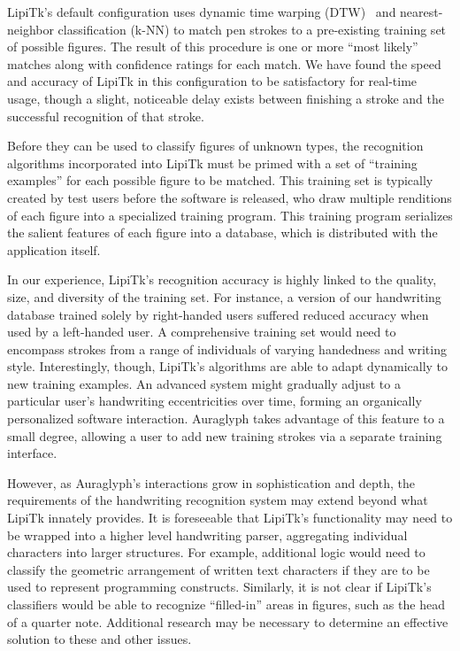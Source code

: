 \documentclass[10pt,letterpaper]{article}
\begin{document}
LipiTk's default configuration uses dynamic time warping (DTW)~\cite{niels2005using} and nearest-neighbor classification (k-NN) to match pen strokes to a pre-existing training set of possible figures. 
The result of this procedure is one or more ``most likely'' matches along with confidence ratings for each match. 
We have found the speed and accuracy of LipiTk in this configuration to be satisfactory for real-time usage, though a slight, noticeable delay exists between finishing a stroke and the successful recognition of that stroke. 

Before they can be used to classify figures of unknown types, the recognition algorithms incorporated into LipiTk must be primed with a set of ``training examples'' for each possible figure to be matched. 
This training set is typically created by test users before the software is released, who draw multiple renditions of each figure into a specialized training program. 
This training program serializes the salient features of each figure into a database, which is distributed with the application itself. 

In our experience, LipiTk's recognition accuracy is highly linked to the quality, size, and diversity of the training set. 
For instance, a version of our handwriting database trained solely by right-handed users suffered reduced accuracy when used by a left-handed user. 
A comprehensive training set would need to encompass strokes from a range of individuals of varying handedness and writing style. 
Interestingly, though, LipiTk's algorithms are able to adapt dynamically to new training examples. 
An advanced system might gradually adjust to a particular user's handwriting eccentricities over time, forming an organically personalized software interaction. 
Auraglyph takes advantage of this feature to a small degree, allowing a user to add new training strokes via a separate training interface. 

However, as Auraglyph's interactions grow in sophistication and depth, the requirements of the handwriting recognition system may extend beyond what LipiTk innately provides. 
It is foreseeable that LipiTk's functionality may need to be wrapped into a higher level handwriting parser, aggregating individual characters into larger structures. 
For example, additional logic would need to classify the geometric arrangement of written text characters if they are to be used to represent programming constructs. 
Similarly, it is not clear if LipiTk's classifiers would be able to recognize ``filled-in'' areas in figures, such as the head of a quarter note. 
Additional research may be necessary to determine an effective solution to these and other issues. 
\end{document}
